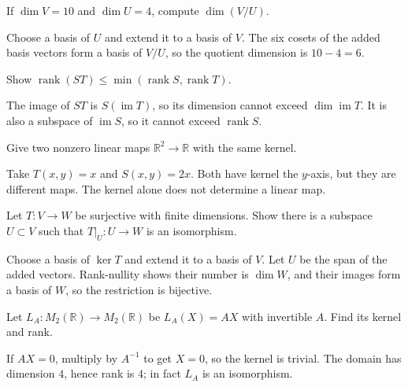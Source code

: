 \begin{problem}\label{prob:i06-problem-07}
If $\dim V=10$ and $\dim U=4$, compute $\dim(V/U)$.
\end{problem}
\begin{solution}
Choose a basis of $U$ and extend it to a basis of $V$. The six cosets of the added basis vectors form a basis of $V/U$, so the quotient dimension is $10-4=6$.
\end{solution}

\begin{problem}\label{prob:i06-problem-08}
Show $\operatorname{rank}(ST)\le\min(\operatorname{rank}S,\operatorname{rank}T)$.
\end{problem}
\begin{solution}
The image of $ST$ is $S(\operatorname{im}T)$, so its dimension cannot exceed $\dim\operatorname{im}T$. It is also a subspace of $\operatorname{im}S$, so it cannot exceed $\operatorname{rank}S$.
\end{solution}

\begin{problem}\label{prob:i06-problem-09}
Give two nonzero linear maps $\mathbb R^2\to\mathbb R$ with the same kernel.
\end{problem}
\begin{solution}
Take $T(x,y)=x$ and $S(x,y)=2x$. Both have kernel the $y$-axis, but they are different maps. The kernel alone does not determine a linear map.
\end{solution}

\begin{problem}\label{prob:i06-problem-10}
Let $T:V\to W$ be surjective with finite dimensions. Show there is a subspace $U\subset V$ such that $T|_U:U\to W$ is an isomorphism.
\end{problem}
\begin{solution}
Choose a basis of $\ker T$ and extend it to a basis of $V$. Let $U$ be the span of the added vectors. Rank-nullity shows their number is $\dim W$, and their images form a basis of $W$, so the restriction is bijective.
\end{solution}

\begin{problem}\label{prob:i06-problem-11}
Let $L_A:M_2(\mathbb R)\to M_2(\mathbb R)$ be $L_A(X)=AX$ with invertible $A$. Find its kernel and rank.
\end{problem}
\begin{solution}
If $AX=0$, multiply by $A^{-1}$ to get $X=0$, so the kernel is trivial. The domain has dimension $4$, hence rank is $4$; in fact $L_A$ is an isomorphism.
\end{solution}

